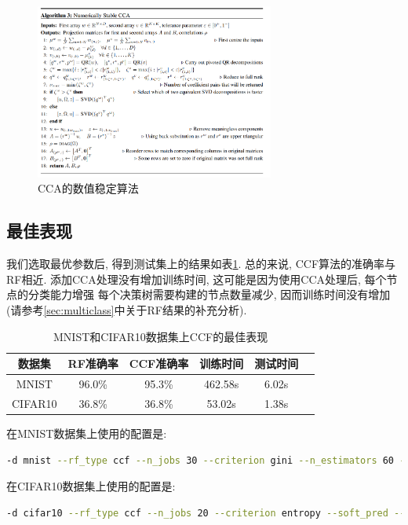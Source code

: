 \documentclass[a4paper]{article}
\begin{document}
\begin{figure}[h]
    \centering
    \includegraphics[width=0.7\textwidth,height=0.5\textwidth]{figs/7.png}
    
    \caption{CCA的数值稳定算法}
    \label{fig:cca_nsa}
\end{figure}

\subsection{最佳表现}
我们选取最优参数后, 得到测试集上的结果如表\ref{table_ccf_perf}. 总的来说, CCF算法的准确率与RF相近. 添加CCA处理没有增加训练时间, 这可能是因为使用CCA处理后, 每个节点的分类能力增强 每个决策树需要构建的节点数量减少, 因而训练时间没有增加(请参考\ref{sec:multiclass}中关于RF结果的补充分析).

\begin{table}[ht]
\centering
\caption{MNIST和CIFAR10数据集上CCF的最佳表现}
\begin{tabular}{|c|c|c|c|c|c|}
\hline
数据集& RF准确率 &CCF准确率&训练时间&测试时间\\
\hline
MNIST & 96.0\% & 95.3\%  &462.58s & 6.02s\\
CIFAR10& 36.8\% & 36.8\% &53.02s & 1.38s\\
\hline
\end{tabular}
\label{table_ccf_perf}
\end{table}


在MNIST数据集上使用的配置是:
 \begin{lstlisting}[language=bash]
-d mnist --rf_type ccf --n_jobs 30 --criterion gini --n_estimators 60 --max_depth 20 --min_samples_split 20 --min_samples_leaf 2  --min_impurity_decrease 1e-12
\end{lstlisting}

 在CIFAR10数据集上使用的配置是:
 \begin{lstlisting}[language=bash]
-d cifar10 --rf_type ccf --n_jobs 20 --criterion entropy --soft_pred --n_estimators 65 --max_depth 27 --min_samples_split 2 --min_samples_leaf 56 --min_impurity_decrease 2.07e-14
\end{lstlisting}
\end{document}
